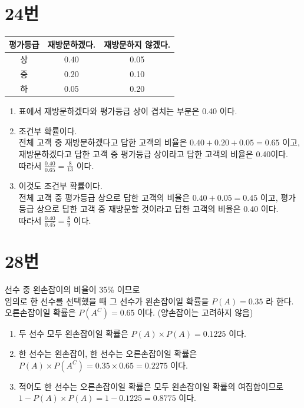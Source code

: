 \documentclass[12px]{article}
\begin{document}
\section*{24번}
\begin{center}
    \begin{tabular}{ |c|c|c| } 
     \hline
     평가등급 & 재방문하겠다. & 재방문하지 않겠다. \\ 
     \hline
     상 & 0.40 & 0.05 \\ 
     중 & 0.20 & 0.10 \\ 
     하 & 0.05 & 0.20 \\
     \hline
\end{tabular}
\end{center}
\begin{enumerate}[(1)]
    \item
    표에서 재방문하겠다와 평가등급 상이 겹치는 부분은 0.40 이다.
    \item
    조건부 확률이다.\\
    전체 고객 중 재방문하겠다고 답한 고객의 비율은 \(0.40 + 0.20 + 0.05 = 0.65 \) 이고, 재방문하겠다고 답한 고객 중 평가등급 상이라고 답한 고객의 비율은 0.40이다.\\
    따라서 \(\frac{0.40}{0.65} = \frac{8}{13} \) 이다.
    \item
    이것도 조건부 확률이다.\\
    전체 고객 중 평가등급 상으로 답한 고객의 비율은 \(0.40 + 0.05 = 0.45 \) 이고, 평가등급 상으로 답한 고객 중 재방문할 것이라고 답한 고객의 비율은 0.40 이다.\\
    따라서 \(\frac{0.40}{0.45} = \frac{8}{9} \) 이다.
\end{enumerate}

\section*{28번}
선수 중 왼손잡이의 비율이 35\% 이므로\\
임의로 한 선수를 선택했을 때 그 선수가 왼손잡이일 확률을 \(P(A) = 0.35 \) 라 한다.\\
오른손잡이일 확률은 \(P(A^C) = 0.65 \) 이다. (양손잡이는 고려하지 않음)
\begin{enumerate}[(1)]
    \item
    두 선수 모두 왼손잡이일 확률은 \(P(A) \times P(A) =  0.1225 \) 이다.
    \item
    한 선수는 왼손잡이, 한 선수는 오른손잡이일 확률은\\
    \(P(A) \times P(A^C) = 0.35 \times 0.65 = 0.2275 \) 이다.
    \item
    적어도 한 선수는 오른손잡이일 확률은 모두 왼손잡이일 확률의 여집합이므로\\
    \(1 - P(A) \times P(A) = 1 - 0.1225 = 0.8775 \) 이다.
\end{enumerate}
\end{document}
